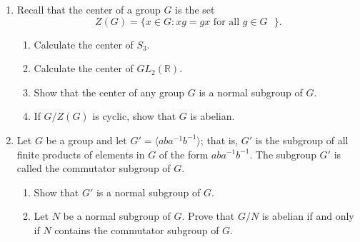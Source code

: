 {\begin{enumerate}
 
\item
Recall that the {\bfi center\/} of a group $G$ is
the set 
\[
Z(G) = \{ x \in G : xg = gx \mbox{ for all $g \in G$ } \}.
\]
\begin{enumerate}
 
 \item
Calculate the center of $S_3$.
 
 \item
Calculate the center of $GL_2 ( {\mathbb R} )$.
 
 \item
Show that the center of any group $G$ is a normal subgroup of $G$. 
 
 \item
If $G / Z(G)$ is cyclic, show that $G$ is abelian.
 
\end{enumerate}
 
 
 
 
\item
Let $G$ be a group and let $G' = \langle aba^{- 1} b^{-1} \rangle$;
that is, $G'$ is the subgroup of all finite products of elements in
$G$ of the form $aba^{-1}b^{-1}$.  The subgroup $G'$ is called the
{\bfi commutator
subgroup\/}\label{commutatorsubgroup} of $G$.  
\begin{enumerate}
 
 \item
Show that $G'$ is a normal subgroup of $G$.

 \item
Let $N$ be  a normal subgroup of $G$.  Prove that $G/N$ is abelian if
and only if $N$ contains the commutator subgroup of $G$.
 
\end{enumerate}

 
% 
% 
% 
% 
% 
% 
% 


\end{enumerate}
}
 


